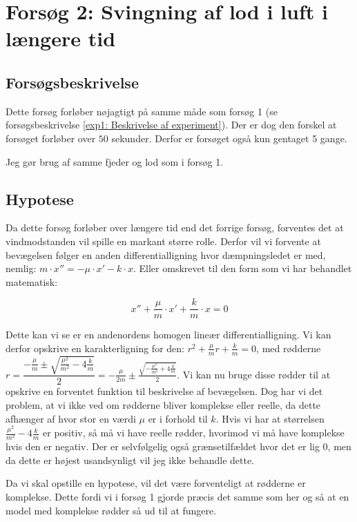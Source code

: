 \section{Forsøg 2: Svingning af lod i luft i længere tid}

\subsection{Forsøgsbeskrivelse}
Dette forsøg forløber nøjagtigt på samme måde som forsøg 1 (se forsøgsbeskrivelse \ref{exp1: Beskrivelse af experiment}).
Der er dog den forskel at forsøget forløber over $50$ sekunder. 
Derfor er forsøget også kun gentaget 5 gange. 

Jeg gør brug af samme fjeder og lod som i forsøg 1.

\subsection{Hypotese}\label{exp2: Hypotese}
Da dette forsøg forløber over længere tid end det forrige forsøg, forventes det at vindmodstanden vil spille en markant større rolle. 
Derfor vil vi forvente at bevægelsen følger en anden differentialligning hvor dæmpningsledet er med, nemlig:
$m\cdot x''= -\mu \cdot x' - k\cdot x$.
Eller omskrevet til den form som vi har behandlet matematisk:

$$x''+ \frac{\mu}{m} \cdot x' + \frac{k}{m}\cdot x=0$$

Dette kan vi  se er en andenordens homogen lineær differentialligning.
Vi kan derfor opskrive en karakterligning for den:
$r^2 + \frac{\mu}{m} r + \frac{k}{m} = 0$, med rødderne $r = \dfrac{-\frac{\mu}{m} \pm \sqrt{\frac{\mu^2}{m^2}-4\frac{k}{m}}}{2}=
-\frac{\mu}{2m}  \pm   \frac{\sqrt{-\frac{\mu^2}{m^2}+4\frac{k}{m}}}{2}$.
Vi kan nu bruge disse rødder til at opskrive en forventet funktion til beskrivelse af bevægelsen. 
Dog har vi det problem, at vi ikke ved om rødderne bliver komplekse eller reelle, da dette afhænger af hvor stor en værdi $\mu$ er i forhold til $k$.
Hvis vi har at størrelsen $\frac{\mu^2}{m^2}-4\frac{k}{m}$ er positiv, så må vi have reelle rødder, hvorimod vi må have komplekse hvis den er negativ. 
Der er selvfølgelig også grænsetilfældet hvor det er lig $0$, men da dette er højest usandsynligt vil jeg ikke behandle dette. 

Da vi skal opstille en hypotese, vil det være forventeligt at rødderne er komplekse. 
Dette fordi vi i forsøg 1 gjorde præcis det samme som her og så at en model med komplekse rødder så ud til at fungere. 

